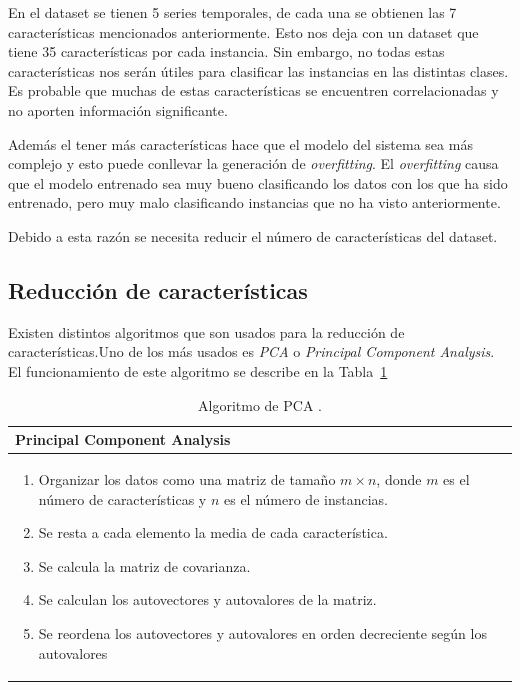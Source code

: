 En el dataset se tienen 5 series temporales, de cada una se obtienen las 7 características mencionados anteriormente. Esto nos deja con un dataset que tiene 35 características por cada instancia. Sin embargo, no todas estas características nos serán útiles para clasificar las instancias en las distintas clases. Es probable que muchas de estas características se encuentren correlacionadas y no aporten información significante.

Además el tener más características hace que el modelo del sistema sea más complejo y esto puede conllevar la generación de \textit{overfitting}. El \textit{overfitting} causa que el modelo entrenado sea muy bueno clasificando los datos con los que ha sido entrenado, pero muy malo clasificando instancias que no ha visto anteriormente.

Debido a esta razón se necesita reducir el número de  características del dataset.

\subsection{Reducción de características}

Existen distintos algoritmos que son usados para la reducción de características.Uno de los más usados es \textit{PCA} o \textit{Principal Component Analysis}. El funcionamiento de este algoritmo se describe en la Tabla~\ref{diag:PCA}


\bgroup
\def\arraystretch{1.5}%
\begin{table}[htbp!]
\centering
\caption[Algoritmo de PCA]{Algoritmo de PCA \cite{Data_mining_techniques}.}
\begin{tabular}{p{}}
\toprule
Principal Component Analysis \\ \midrule
\vspace{-9mm}
\begin{enumerate}
    \itemsep0em
    \topsep0pt
    \item Organizar los datos como una matriz  de tamaño $m\times n$, donde $m$ es el número de características y $n$ es el número de instancias.
    \item Se resta a cada elemento la media de cada característica.
    \item Se calcula la matriz de covarianza.
    \item Se calculan los autovectores y autovalores de la matriz.
    \item Se reordena los autovectores y autovalores en orden decreciente según los autovalores
\end{enumerate}\\ \bottomrule
\end{tabular}
\label{diag:PCA}
\end{table}
\egroup

